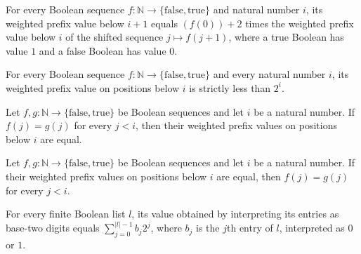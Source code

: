 \begin{theorem}
\label{BoolCircuit.prefixVal_succ'}
\leanok
{}
For every Boolean sequence $f:\mathbb{N}\to\{\mathrm{false},\mathrm{true}\}$ and natural
number $i$, its weighted prefix value below $i+1$ equals $(f(0)) + 2$ times the weighted
prefix value below $i$ of the shifted sequence $j\mapsto f(j+1)$, where a true Boolean
has value $1$ and a false Boolean has value $0$.
\end{theorem}

\begin{theorem}
\label{BoolCircuit.prefixVal_lt}
\leanok
{}
For every Boolean sequence $f:\mathbb{N}\to\{\mathrm{false},\mathrm{true}\}$ and every
natural number $i$, its weighted prefix value on positions below $i$ is strictly less
than $2^i$.
\end{theorem}

\begin{theorem}
\label{BoolCircuit.prefixVal_congr}
\leanok
{}
Let $f,g:\mathbb{N}\to\{\mathrm{false},\mathrm{true}\}$ be Boolean sequences and let $i$
be a natural number. If $f(j)=g(j)$ for every $j<i$, then their weighted prefix values
on positions below $i$ are equal.
\end{theorem}

\begin{theorem}
\label{BoolCircuit.prefixVal_inj}
\leanok
{}
Let $f,g:\mathbb{N}\to\{\mathrm{false},\mathrm{true}\}$ be Boolean sequences and let $i$
be a natural number. If their weighted prefix values on positions below $i$ are equal,
then $f(j)=g(j)$ for every $j<i$.
\end{theorem}

\begin{theorem}
\label{BoolCircuit.bitsVal_eq_prefixVal}
\leanok
{}
For every finite Boolean list $l$, its value obtained by interpreting its entries as
base-two digits equals $\sum_{j=0}^{|l|-1} b_j2^j$, where $b_j$ is the $j$th entry of
$l$, interpreted as $0$ or $1$.
\end{theorem}

